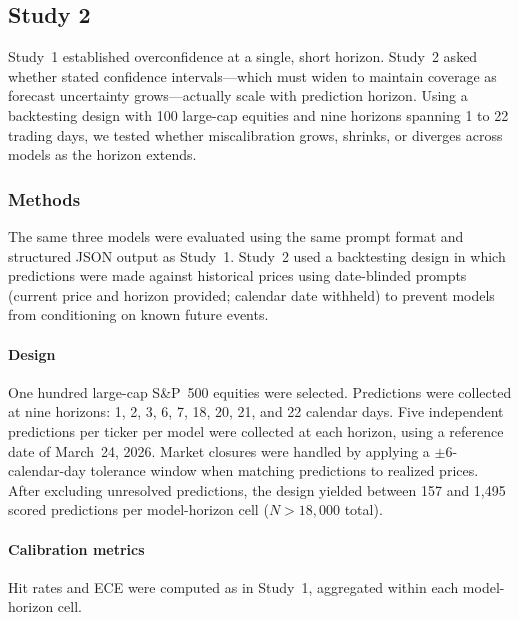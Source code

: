 
\subsection*{Study 2}

Study~1 established overconfidence at a single, short horizon. Study~2 asked
whether stated confidence intervals---which must widen to maintain coverage
as forecast uncertainty grows---actually scale with prediction horizon.
Using a backtesting design with 100 large-cap equities and nine horizons spanning
1 to 22 trading days, we tested whether miscalibration grows, shrinks, or
diverges across models as the horizon extends.

\subsubsection*{Methods}

The same three models were evaluated using the same prompt format and
structured JSON output as Study~1. Study~2 used a backtesting design in which
predictions were made against historical prices using date-blinded prompts
(current price and horizon provided; calendar date withheld) to prevent
models from conditioning on known future events.

\paragraph{Design} One hundred large-cap S\&P~500 equities were selected.
Predictions were collected at nine horizons: 1, 2, 3, 6, 7, 18, 20, 21, and
22 calendar days. Five independent predictions per ticker per model were
collected at each horizon, using a reference date of March~24, 2026.
Market closures were handled by applying a $\pm$6-calendar-day tolerance
window when matching predictions to realized prices. After excluding
unresolved predictions, the design yielded between 157 and 1,495 scored
predictions per model-horizon cell ($N > 18{,}000$ total).

\paragraph{Calibration metrics} Hit rates and ECE were computed as in
Study~1, aggregated within each model-horizon cell.

